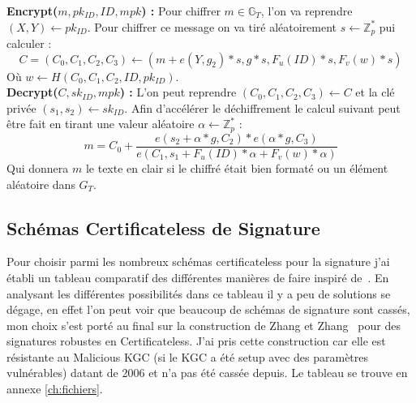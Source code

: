 \textbf{Encrypt($m, pk_{ID}, ID, mpk$) :} Pour chiffrer $m \in \mathbb{G}_T$, l'on va reprendre $(X,Y) \leftarrow pk_{ID}$. Pour chiffrer ce message on va tiré aléatoirement $s \leftarrow \mathbb{Z}_p^*$ pui calculer : 
\[C = (C_0, C_1, C_2, C_3) \leftarrow (m + e(Y, g_2)*s, g*s,F_u(ID)*s, F_v(w)*s )\]
Où $w \leftarrow H(C_0,C_1, C_2, ID, pk_{ID})$.\\
\textbf{Decrypt($C, sk_{ID}, mpk$) :} L'on peut reprendre $(C_0,C_1,C_2,C_3) \leftarrow C$ et la clé privée $(s_1, s_2) \leftarrow sk_{ID}$. Afin d'accélérer le déchiffrement le calcul suivant peut être fait en tirant une valeur aléatoire $\alpha \leftarrow \mathbb{Z}_p^*$ :
\[m = C_0 + \frac{e(s_2 + \alpha*g, C_2 )*e(\alpha*g, C_3)}{e(C_1, s_1 + F_u(ID)*\alpha + F_v(w)*\alpha)}\]
Qui donnera $m$ le texte en clair si le chiffré était bien formaté ou un élément aléatoire dans $G_T$.
\subsection{Schémas Certificateless de Signature}
Pour choisir parmi les nombreux schémas certificateless pour la signature j'ai établi un tableau comparatif des différentes manières de faire inspiré de~\cite{bookIntroCertificateless}. En analysant les différentes possibilités dans ce tableau il y a peu de solutions se dégage, en effet l'on peut voir que beaucoup de schémas de signature sont cassés, mon choix s'est porté au final sur la construction de Zhang et Zhang~\cite{DBLP:conf/acns/ZhangWXF06} pour des signatures robustes en Certificateless. J'ai pris cette construction car elle est résistante au Malicious KGC (si le KGC a été setup avec des paramètres vulnérables) datant de 2006 et n'a pas été cassée depuis. Le tableau se trouve en annexe \ref{ch:fichiers}.
